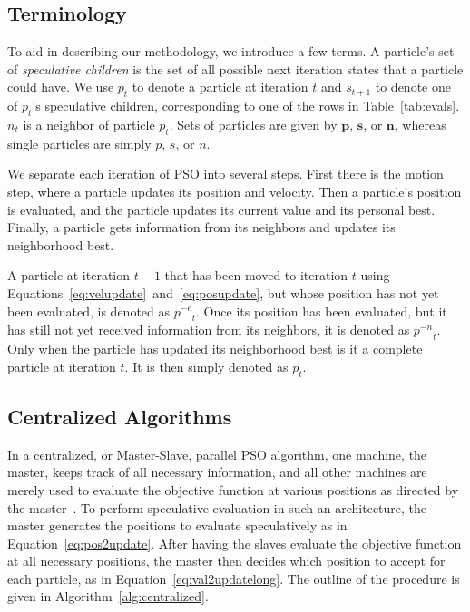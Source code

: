\documentclass[journal,letterpaper]{IEEEtran}
\newcommand{\alg}[1]{Algorithm~\ref{alg:#1}}
\providecommand{\noeval}[1]{\ensuremath{#1^{-e}}}
\providecommand{\nonbest}[1]{\ensuremath{#1^{-n}}}
\providecommand{\p}{\ensuremath{p}}
\providecommand{\pset}{\ensuremath{\mathbf{p}}}
\providecommand{\s}{\ensuremath{s}}
\providecommand{\sset}{\ensuremath{\mathbf{s}}}
\providecommand{\n}{\ensuremath{n}}
\providecommand{\nset}{\ensuremath{\mathbf{n}}}
\begin{document}
\subsection{Terminology}

To aid in describing our methodology, we introduce a few terms.  A particle's
set of \emph{speculative children} is the set of all possible next iteration
states that a particle could have.  We use $\p_t$ to denote a particle at
iteration $t$ and $\s_{t+1}$ to denote one of $\p_t$'s speculative children,
corresponding to one of the rows in Table~\ref{tab:evals}.  $\n_t$ is a
neighbor of particle $\p_t$.  Sets of particles are given by $\pset$, $\sset$,
or $\nset$, whereas single particles are simply $\p$, $\s$, or $\n$.

We separate each iteration of PSO into several steps.  First there is the
motion step, where a particle updates its position and velocity.  Then a
particle's position is evaluated, and the particle updates its current value
and its personal best.  Finally, a particle gets information from its neighbors
and updates its neighborhood best.

A particle at iteration $t-1$ that has been moved to iteration $t$ using
Equations~\eqref{eq:velupdate}~and~\eqref{eq:posupdate}, but whose position has
not yet been evaluated, is denoted as $\noeval{\p}_t$.  Once its position has
been evaluated, but it has still not yet received information from its
neighbors, it is denoted as $\nonbest{\p}_t$.  Only when the particle has
updated its neighborhood best is it a complete particle at iteration $t$.  It
is then simply denoted as $\p_t$.

\subsection{Centralized Algorithms}

In a centralized, or Master-Slave, parallel PSO algorithm, one machine, the
master, keeps track of all necessary information, and all other machines are
merely used to evaluate the objective function at various positions as directed
by the master~\cite{belal-2004-parallel-models-for-pso}.  To perform speculative evaluation in such
an architecture, the master generates the positions to evaluate speculatively
as in Equation~\eqref{eq:pos2update}.  After having the slaves evaluate the
objective function at all necessary positions, the master then decides which
position to accept for each particle, as in Equation~\eqref{eq:val2updatelong}.
The outline of the procedure is given in \alg{centralized}.
\end{document}
